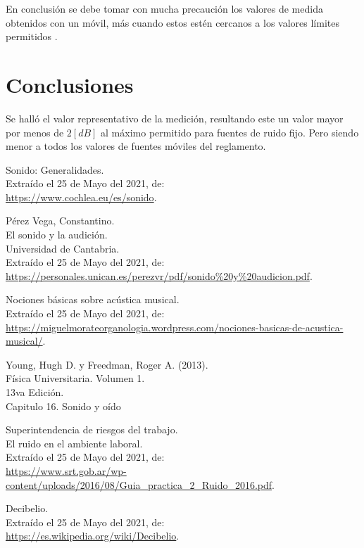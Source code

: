 \documentclass[letter,11pt]{article}
\begin{document}
En conclusión se debe tomar con mucha precaución los valores de medida obtenidos
con un móvil, más cuando estos estén cercanos a los valores límites permitidos
\cite{ALLPE}.

\section{Conclusiones}

Se halló el valor representativo de la medición, resultando este un valor mayor
por menos de $2 [dB]$ al máximo permitido para fuentes de ruido fijo. Pero
siendo menor a todos los valores de fuentes móviles del reglamento.

\begin{thebibliography}{99}

 Sonido: Generalidades.\\
Extraído el 25 de Mayo del 2021, de:\\
{\small \url{https://www.cochlea.eu/es/sonido}.}

 Pérez Vega, Constantino.\\
El sonido y la audición.\\
Universidad de Cantabria.\\
Extraído el 25 de Mayo del 2021, de: \\
{\small \url{https://personales.unican.es/perezvr/pdf/sonido%20y%20audicion.pdf}.}

 Nociones básicas sobre acústica musical.\\
Extraído el 25 de Mayo del 2021, de: \\
{\small \url{https://miguelmorateorganologia.wordpress.com/nociones-basicas-de-acustica-musical/}.}

 Young, Hugh D. y Freedman, Roger A. (2013).\\
Física Universitaria. Volumen 1.\\
13va Edición.\\
Capitulo 16. Sonido y oído

 Superintendencia de riesgos del trabajo.\\
El ruido en el ambiente laboral.\\
Extraído el 25 de Mayo del 2021, de: \\
{\small \url{https://www.srt.gob.ar/wp-content/uploads/2016/08/Guia_practica_2_Ruido_2016.pdf}.}

 Decibelio.\\
Extraído el 25 de Mayo del 2021, de: \\
{\small \url{https://es.wikipedia.org/wiki/Decibelio}.}


\end{thebibliography}
\end{document}
